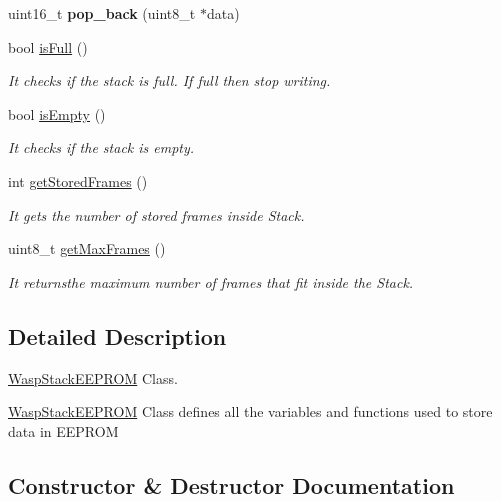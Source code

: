 \begin{DoxyCompactItemize}
\item 
uint16\+\_\+t {\bfseries pop\+\_\+back} (uint8\+\_\+t $\ast$data)\hypertarget{class_wasp_stack_e_e_p_r_o_m_af318d0a17f0de94f380cf2f4b84e7fb2}{}\label{class_wasp_stack_e_e_p_r_o_m_af318d0a17f0de94f380cf2f4b84e7fb2}

\item 
bool \hyperlink{class_wasp_stack_e_e_p_r_o_m_a62755251d485e722419fbe35989bffce}{is\+Full} ()
\begin{DoxyCompactList}\small\item\em It checks if the stack is full. If full then stop writing. \end{DoxyCompactList}\item 
bool \hyperlink{class_wasp_stack_e_e_p_r_o_m_a6ef53bf5e4053128aff1478b597f257d}{is\+Empty} ()
\begin{DoxyCompactList}\small\item\em It checks if the stack is empty. \end{DoxyCompactList}\item 
int \hyperlink{class_wasp_stack_e_e_p_r_o_m_a022f66081c94aa33aa3072975d556a87}{get\+Stored\+Frames} ()
\begin{DoxyCompactList}\small\item\em It gets the number of stored frames inside Stack. \end{DoxyCompactList}\item 
uint8\+\_\+t \hyperlink{class_wasp_stack_e_e_p_r_o_m_a1f93925f609a16d139d192d823621682}{get\+Max\+Frames} ()
\begin{DoxyCompactList}\small\item\em It returnsthe maximum number of frames that fit inside the Stack. \end{DoxyCompactList}\end{DoxyCompactItemize}


\subsection{Detailed Description}
\hyperlink{class_wasp_stack_e_e_p_r_o_m}{Wasp\+Stack\+E\+E\+P\+R\+OM} Class. 

\hyperlink{class_wasp_stack_e_e_p_r_o_m}{Wasp\+Stack\+E\+E\+P\+R\+OM} Class defines all the variables and functions used to store data in E\+E\+P\+R\+OM 

\subsection{Constructor \& Destructor Documentation}
